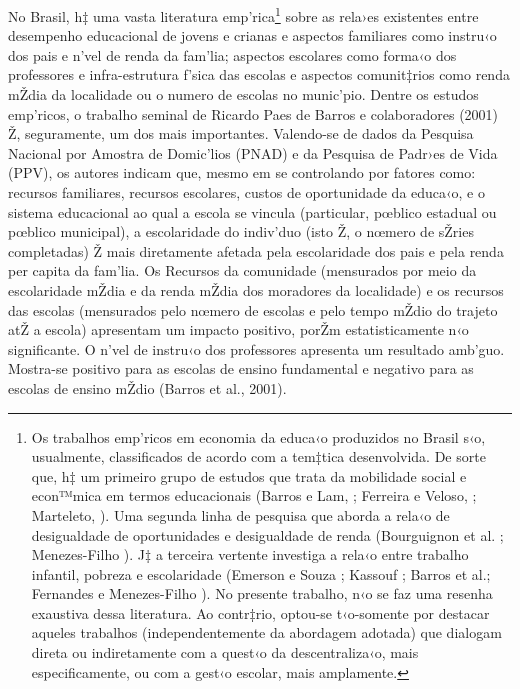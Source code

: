 \documentclass[a4paper, 12pt]{article}
\begin{document}
No Brasil, h‡ uma vasta literatura emp’rica\footnote{Os trabalhos emp’ricos em economia da educa‹o produzidos no Brasil s‹o, usualmente, classificados de acordo com a tem‡tica desenvolvida. De sorte que, h‡ um primeiro grupo de estudos que trata da mobilidade social e econ™mica em termos educacionais (Barros e Lam, \citeyear{de_barros_income_1993}; Ferreira e Veloso, \citeyear{ferreira_mobilidade_2003}; Marteleto, \citeyear{marteleto_desigualdade_2004}). Uma segunda linha de pesquisa que aborda a rela‹o de desigualdade de oportunidades e desigualdade de renda (Bourguignon et al. \citeyear{bourguignon_inequality_2003}; Menezes-Filho \citeyear{menezes-filho_educacao_2001}). J‡ a terceira vertente investiga a rela‹o entre trabalho infantil, pobreza e escolaridade (Emerson e Souza \citeyear{emerson_is_2003}\citeyear{emerson_child_2007}\citeyear{emerson_is_2011}; Kassouf \citeyear{kassouf_early_2001}; Barros et al.\citeyear{de_barros_os_1995}; Fernandes e Menezes-Filho \cite{fernandes_evolucao_2000}). No presente trabalho,  n‹o se faz uma resenha exaustiva dessa literatura. Ao contr‡rio, optou-se t‹o-somente por destacar aqueles trabalhos (independentemente da abordagem adotada) que dialogam direta ou indiretamente com a quest‹o da descentraliza‹o, mais especificamente, ou com a gest‹o escolar, mais amplamente.} sobre as rela›es existentes entre desempenho educacional de jovens e crianas e aspectos familiares como instru‹o dos pais e n’vel de renda da fam’lia; aspectos escolares como forma‹o dos professores e infra-estrutura f’sica das escolas e aspectos comunit‡rios como renda mŽdia da localidade ou o numero de escolas no munic’pio. Dentre os estudos emp’ricos, o trabalho seminal de Ricardo Paes de Barros e colaboradores (2001) Ž, seguramente, um dos mais importantes. Valendo-se de dados da Pesquisa Nacional por Amostra de Domic’lios (PNAD) e da Pesquisa de Padr›es de Vida (PPV), os autores indicam que, mesmo em se controlando por fatores como: recursos familiares, recursos escolares, custos de oportunidade da educa‹o, e o sistema educacional ao qual a escola se vincula (particular, pœblico estadual ou pœblico municipal), a escolaridade do indiv’duo (isto Ž, o nœmero de sŽries completadas) Ž mais diretamente afetada pela escolaridade dos pais e pela renda per capita da fam’lia. Os Recursos da comunidade (mensurados por meio da escolaridade mŽdia e da renda mŽdia dos moradores da localidade) e os recursos das escolas (mensurados pelo nœmero de escolas e pelo tempo mŽdio do trajeto atŽ a escola) apresentam um impacto positivo, porŽm estatisticamente n‹o significante. O n’vel de instru‹o dos professores apresenta um resultado amb’guo. Mostra-se positivo para as escolas de ensino fundamental e negativo para as escolas de ensino mŽdio (Barros et al., 2001).
\end{document}
